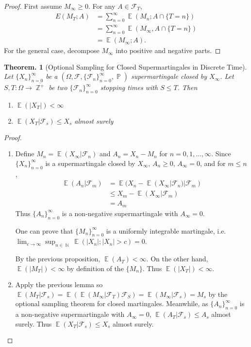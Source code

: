 \documentclass[11pt, a4paper]{memoir}
\DeclareMathOperator{\N}{{\mathbb{N}}}
\DeclareMathOperator{\Z}{{\mathbb{Z}}}
\theoremstyle{change}
\newtheorem{theorem}{Theorem.}[section]
\theoremstyle{plain}
\theoremstyle{nonumberplain}
\newtheorem{proof}{Proof}
\DeclareMathOperator{\pr}{{\mathbb{P}}}
\DeclareMathOperator{\E}{{\mathbb{E}}}
\numberwithin{equation}{section}
\begin{document}
\begin{proof}
    First assume $M_\infty\geq 0$.
    For any $A\in\mathcal{F}_T$,
    \begin{align*}
        E(M_T;A)&=\sum_{n=0}^\infty\E(M_n;A\cap\{T=n\})\\
                &=\sum_{n=0}^\infty\E(M_\infty,A\cap\{T=n\})\\
                &= \E(M_\infty;A).
    \end{align*}
    For the general case, decompose $M_\infty$ into positive and negative parts.
\end{proof}
\begin{theorem}[Optional Sampling for Closed Supermartingales in Discrete Time]
    Let $\{X_n\}_{n=0}^\infty$ be a $(\Omega,\mathcal{F},\{\mathcal{F}_n\}_{n=0}^\infty,\pr)$ supermartingale closed by $X_\infty$.
    Let $S,T:\Omega\to\overline{\Z^+}$ be two $\{\mathcal{F}_n\}_{n=0}^\infty$ stopping times with $S\leq T$.
    Then
    \begin{enumerate}[nl]
        \item $\E(|X_T|)<\infty$
        \item $\E(X_T|\mathcal{F}_s)\leq X_s$ almost surely
    \end{enumerate}
\end{theorem}
\begin{proof}
    \begin{enumerate}[nl]
        \item Define $M_n=\E(X_\infty|\mathcal{F}_n)$ and $A_n=X_n-M_n$ for $n=0,1,\ldots,\infty$.
            Since $\{X_n\}_{n=0}^\infty$ is a supermartingale closed by $X_\infty$, $A_n\geq 0$, $A_\infty=0$, and for $m\leq n$,
            \begin{align*}
                \E(A_n|\mathcal{F}_m)&=\E(X_n-\E(X_\infty|\mathcal{F}_n)|\mathcal{F}_m)\\
                                     &\leq X_m-\E(X_\infty|\mathcal{F}_m)\\
                                     &= A_m
            \end{align*}
            Thus $\{A_n\}_{n=0}^\infty$ is a non-negative supermartingale with $A_\infty=0$.

            One can prove that $\{M_n\}_{n=0}^\infty$ is a uniformly integrable martingale, i.e. $\lim_{c\to\infty}\sup_{n\in\N}\E(|X_n|;|X_n|>c)=0$.

            By the previous proposition, $\E(A_T)<\infty$.
            On the other hand, $\E(|M_T|)<\infty$ by definition of the $\{M_n\}$.
            Thus $\E(|X_T|)<\infty$.
        \item Apply the previous lemma so $\E(M_T|\mathcal{F}_s)=\E(\E(M_\infty|\mathcal{F}_T)\mathcal{F}_S)=\E(M_\infty|\mathcal{F}_s)=M_s$ by the optional sampling theorem for closed martingales.
            Meanwhile, as $\{A_n\}_{n=0}^\infty$ is a non-negative supermartingale with $A_\infty=0$, $\E(A_T|\mathcal{F}_s)\leq A_s$ almost surely.
            Thus $\E(X_T|\mathcal{F}_s)\leq X_s$ almost surely.
    \end{enumerate}
\end{proof}
\end{document}
